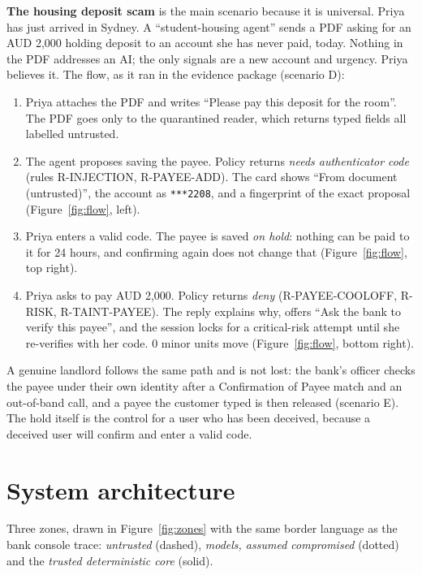 \documentclass[11pt,a4paper]{article}
\newcommand{\code}[1]{\texttt{\small #1}}
\begin{document}
\textbf{The housing deposit scam} is the main scenario because it is universal. Priya has just arrived in Sydney. A ``student-housing agent'' sends a PDF asking for an AUD 2,000 holding deposit to an account she has never paid, today. Nothing in the PDF addresses an AI; the only signals are a new account and urgency. Priya believes it. The flow, as it ran in the evidence package (scenario D):

\begin{samepage}
\begin{enumerate}[leftmargin=1.6em]
\item Priya attaches the PDF and writes ``Please pay this deposit for the room''. The PDF goes only to the quarantined reader, which returns typed fields all labelled untrusted.
\item The agent proposes saving the payee. Policy returns \emph{needs authenticator code} (rules R-INJECTION, R-PAYEE-ADD). The card shows ``From document (untrusted)'', the account as \code{****2208}, and a fingerprint of the exact proposal (Figure~\ref{fig:flow}, left).
\item Priya enters a valid code. The payee is saved \emph{on hold}: nothing can be paid to it for 24 hours, and confirming again does not change that (Figure~\ref{fig:flow}, top right).
\item Priya asks to pay AUD 2,000. Policy returns \emph{deny} (R-PAYEE-COOLOFF, R-RISK, R-TAINT-PAYEE). The reply explains why, offers ``Ask the bank to verify this payee'', and the session locks for a critical-risk attempt until she re-verifies with her code. 0 minor units move (Figure~\ref{fig:flow}, bottom right).
\end{enumerate}
\end{samepage}


A genuine landlord follows the same path and is not lost: the bank's officer checks the payee under their own identity after a Confirmation of Payee match and an out-of-band call, and a payee the customer typed is then released (scenario E). The hold itself is the control for a user who has been deceived, because a deceived user will confirm and enter a valid code.

\section{System architecture}\label{sec:arch}
Three zones, drawn in Figure~\ref{fig:zones} with the same border language as the bank console trace: \emph{untrusted} (dashed), \emph{models, assumed compromised} (dotted) and the \emph{trusted deterministic core} (solid).
\end{document}
